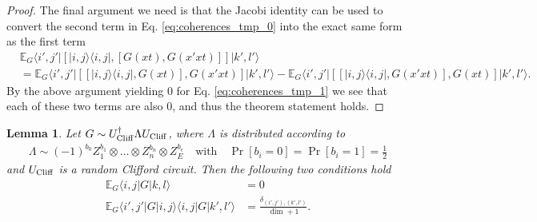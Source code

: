 \documentclass[
 amsmath,amssymb,
 aps,
onecolumn, 
nofootinbib]{revtex4-2}
\newtheorem{lemma}[theorem]{Lemma}
\newcommand{\ket}[1]{|#1\rangle}
\newcommand{\bra}[1]{\langle #1|}
\newcommand{\ketbra}[2]{| #1\rangle\! \langle #2|}
\newcommand{\EE}{\mathbb{E}}
\newcommand{\tp}{\otimes}
\begin{document}
\begin{proof}
The final argument we need is that the Jacobi identity can be used to convert the second term in Eq. \eqref{eq:coherences_tmp_0} into the exact same form as the first term
\begin{align}
    &\EE_G \bra{i',j'} [\ketbra{i,j}{i,j}, [G(xt), G(x' x t)]] \ket{k',l'} \nonumber \\
    &= \EE_G \bra{i',j'}[[\ketbra{i,j}{i,j}, G(xt)], G(x' x t)] \ket{k',l'} - \EE_G \bra{i',j'} [[\ketbra{i,j}{i,j}, G(x' x t)], G(xt)] \ket{k',l'}.
\end{align}
By the above argument yielding 0 for Eq. \eqref{eq:coherences_tmp_1} we see that each of these two terms are also 0, and thus the theorem statement holds. 
\end{proof}

\begin{lemma} \label{lem:coherences_and_amplitude_avg}
    Let $G \sim U_{\rm Cliff}^\dagger \Lambda U_{\rm Cliff}$, where $\Lambda$ is distributed according to
    \begin{align}
        \Lambda \sim (-1)^{b_0} Z_1^{b_1} \tp \ldots \tp Z_{n}^{b_n} \tp Z_E^{b_e} \quad \text{with} \quad \Pr[b_i = 0] = \Pr[b_i = 1] = \frac{1}{2}
    \end{align}
    and $U_{\rm Cliff}$ is a random Clifford circuit. Then the following two conditions hold
    \begin{align}
        \EE_G \bra{i,j} G \ket{k, l} &= 0 \\
        \EE_G \bra{i',j' } G \ket{i,j} \bra{i,j} G \ket{k', l'} &=  \frac{\delta_{(i', j'), (k', l')}}{\dim + 1}.
    \end{align}
\end{lemma}
\end{document}
